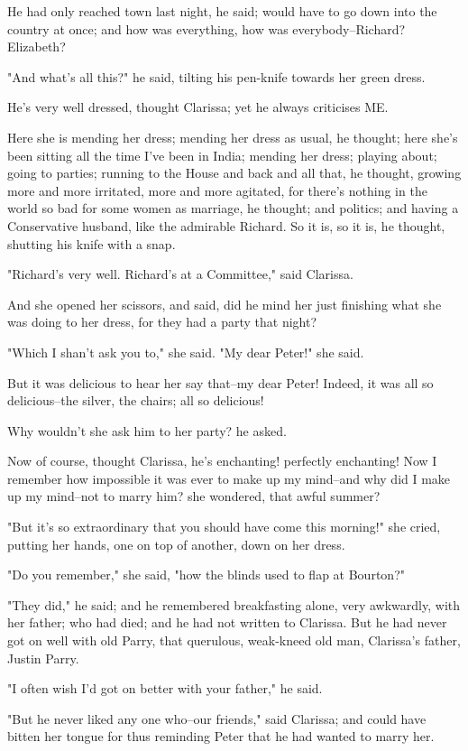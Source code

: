 \documentclass[lang=cn,10pt]{elegantbook}
\begin{document}
He had only reached town last night, he said; would have to go down
into the country at once; and how was everything, how was
everybody--Richard?  Elizabeth?

"And what's all this?" he said, tilting his pen-knife towards her
green dress.

He's very well dressed, thought Clarissa; yet he always criticises
ME.

Here she is mending her dress; mending her dress as usual, he
thought; here she's been sitting all the time I've been in India;
mending her dress; playing about; going to parties; running to the
House and back and all that, he thought, growing more and more
irritated, more and more agitated, for there's nothing in the world
so bad for some women as marriage, he thought; and politics; and
having a Conservative husband, like the admirable Richard.  So it
is, so it is, he thought, shutting his knife with a snap.

"Richard's very well.  Richard's at a Committee," said Clarissa.

And she opened her scissors, and said, did he mind her just
finishing what she was doing to her dress, for they had a party
that night?

"Which I shan't ask you to," she said.  "My dear Peter!" she said.

But it was delicious to hear her say that--my dear Peter!  Indeed,
it was all so delicious--the silver, the chairs; all so delicious!

Why wouldn't she ask him to her party? he asked.

Now of course, thought Clarissa, he's enchanting! perfectly
enchanting!  Now I remember how impossible it was ever to make up
my mind--and why did I make up my mind--not to marry him? she
wondered, that awful summer?

"But it's so extraordinary that you should have come this morning!"
she cried, putting her hands, one on top of another, down on her
dress.

"Do you remember," she said, "how the blinds used to flap at
Bourton?"

"They did," he said; and he remembered breakfasting alone, very
awkwardly, with her father; who had died; and he had not written to
Clarissa.  But he had never got on well with old Parry, that
querulous, weak-kneed old man, Clarissa's father, Justin Parry.

"I often wish I'd got on better with your father," he said.

"But he never liked any one who--our friends," said Clarissa; and
could have bitten her tongue for thus reminding Peter that he had
wanted to marry her.
\end{document}
